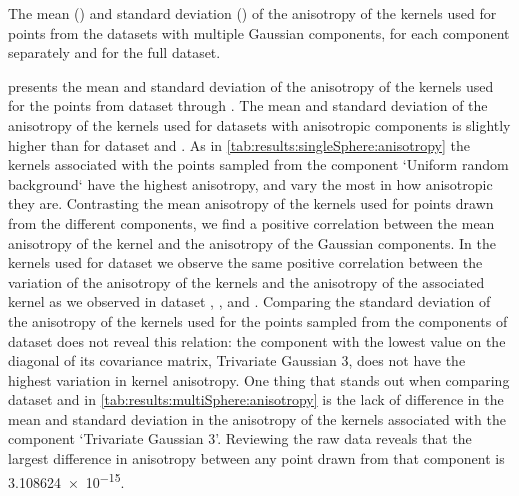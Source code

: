 	\begin{table*}
		\centering
		
		\caption{The mean (\mean) and standard deviation (\SD) of the anisotropy of the kernels used for points from the datasets with multiple Gaussian components, for each component separately and for the full dataset.} 	
		\label{tab:results:multiSphere:anisotropy}
	\end{table*}
	 presents the mean and standard deviation of the anisotropy of the kernels used for the points from dataset \ferdosiTwo through \baakmanThree.
	The mean and standard deviation of the anisotropy of the kernels used for datasets with anisotropic components is slightly higher than for dataset \ferdosiTwo and \ferdosiThree.
	As in \cref{tab:results:singleSphere:anisotropy} the kernels associated with the points sampled from the component `Uniform random background` have the highest anisotropy, and vary the most in how anisotropic they are. 
	Contrasting the mean anisotropy of the kernels used for points drawn from the different components, we find a positive correlation between the mean anisotropy of the kernel and the anisotropy of the Gaussian components. 
		In the kernels used for dataset \baakmanTwo we observe the same positive correlation between the variation of the anisotropy of the kernels and the anisotropy of the associated kernel as we observed in dataset \baakmanOne, \baakmanFour, and \baakmanFive. 
		Comparing the standard deviation of the anisotropy of the kernels used for the points sampled from the components of dataset \baakmanThree does not reveal this relation: the component with the lowest value on the diagonal of its covariance matrix,  Trivariate Gaussian 3, does not have the highest variation in kernel anisotropy. 
	One thing that stands out when comparing dataset \ferdosiThree and \baakmanThree in \cref{tab:results:multiSphere:anisotropy} is the lack of difference in the mean and standard deviation in the anisotropy of the kernels associated with the component `Trivariate Gaussian 3'. Reviewing the raw data reveals that the largest difference in anisotropy between any point drawn from that component is \num{3.108624e-15}.

